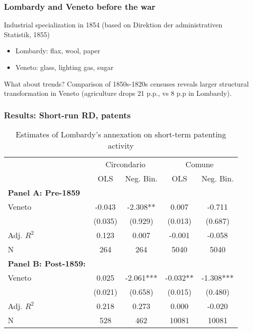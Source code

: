 \documentclass[10pt]{beamer}
\begin{document}
\begin{frame}
    \frametitle{Lombardy and Veneto before the war}

    Industrial specialization in 1854 (based on Direktion der administrativen Statistik, 1855)
    \begin{itemize}
        \item Lombardy: flax, wool, paper
        \item Veneto: glass, lighting gas, sugar
    \end{itemize}

    \bigskip
    \pause
    
    What about trends? Comparison of 1850s-1820s censuses reveals larger structural transformation in Veneto (agriculture drops 21 p.p., vs 8 p.p in Lombardy).
  
\end{frame}


\begin{frame}
    \frametitle{Results: Short-run RD, patents}

        \begin{table}
        \centering
        \caption{Estimates of Lombardy's annexation on short-term patenting activity\label{tab:patent}}
            \begin{tabular}{lcccc}  %
            \toprule
            & \multicolumn{2}{c}{Circondario} & \multicolumn{2}{c}{Comune} \\ \cmidrule(lr){2-3}\cmidrule(lr){4-5}
            & OLS & Neg. Bin. & OLS & Neg. Bin. \\ \midrule
            \textbf{Panel A: Pre-1859} & & & & \\
            Veneto & -0.043 & -2.308** & 0.007 & -0.711 \\
            & (0.035) & (0.929) & (0.013) & (0.687) \\
            Adj. $R^2$ & 0.123 & 0.007 & -0.001 & -0.058 \\
            N & 264 & 264 & 5040 & 5040 \\ \midrule
            \textbf{Panel B: Post-1859:} & & & & \\
            Veneto & 0.025 & -2.061*** & -0.032** & -1.308*** \\
            & (0.021) & (0.658) & (0.015) & (0.480) \\
            Adj. $R^2$ & 0.218 & 0.273 & 0.000 & -0.020 \\
            N & 528 & 462 & 10081 & 10081 \\
            \bottomrule
            \end{tabular}
        
        \end{table}

\end{frame}
\end{document}
